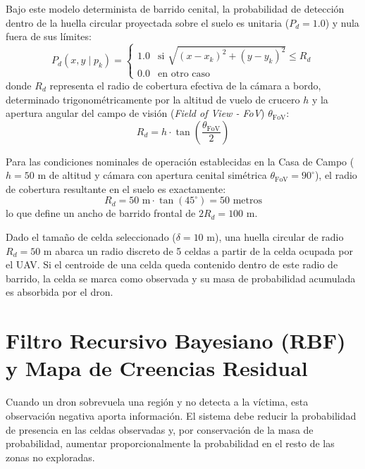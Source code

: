 Bajo este modelo determinista de barrido cenital, la probabilidad de detección dentro de la huella circular proyectada sobre el suelo es unitaria ($P_d = 1.0$) y nula fuera de sus límites:
\begin{equation}
    P_d(x,y \mid p_k) = \begin{cases} 
        1.0 & \text{si } \sqrt{(x - x_k)^2 + (y - y_k)^2} \le R_d \\ 
        0.0 & \text{en otro caso} 
    \end{cases}
\end{equation}
donde $R_d$ representa el radio de cobertura efectiva de la cámara a bordo, determinado trigonométricamente por la altitud de vuelo de crucero $h$ y la apertura angular del campo de visión (\textit{Field of View - FoV}) $\theta_{\text{FoV}}$:
\begin{equation}
    R_d = h \cdot \tan\left(\frac{\theta_{\text{FoV}}}{2}\right)
\end{equation}

Para las condiciones nominales de operación establecidas en la Casa de Campo ($h = 50\text{ m}$ de altitud y cámara con apertura cenital simétrica $\theta_{\text{FoV}} = 90^\circ$), el radio de cobertura resultante en el suelo es exactamente:
\begin{equation}
    R_d = 50\text{ m} \cdot \tan(45^\circ) = 50\text{ metros}
\end{equation}
lo que define un ancho de barrido frontal de $2 R_d = 100\text{ m}$.

Dado el tamaño de celda seleccionado ($\delta = 10\text{ m}$), una huella circular de radio $R_d = 50\text{ m}$ abarca un radio discreto de 5 celdas a partir de la celda ocupada por el UAV. Si el centroide de una celda queda contenido dentro de este radio de barrido, la celda se marca como observada y su masa de probabilidad acumulada es absorbida por el dron.

\section{Filtro Recursivo Bayesiano (RBF) y Mapa de Creencias Residual}

Cuando un dron sobrevuela una región y no detecta a la víctima, esta observación negativa aporta información. El sistema debe reducir la probabilidad de presencia en las celdas observadas y, por conservación de la masa de probabilidad, aumentar proporcionalmente la probabilidad en el resto de las zonas no exploradas.

